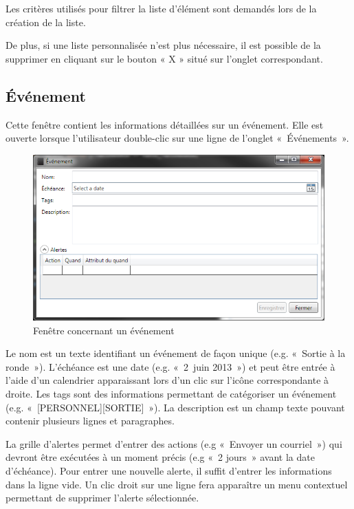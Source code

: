 \documentclass[letterpaper, oneside, 12pt, these, creativecommons]{thETS}
\begin{document}
Les critères utilisés pour filtrer la liste d'élément sont demandés lors de la création de la liste.

De plus, si une liste personnalisée n'est plus nécessaire, il est possible de la supprimer en cliquant sur le bouton « X » situé sur l'onglet correspondant.

\subsection{Événement}

Cette fenêtre contient les informations détaillées sur un événement. Elle est ouverte lorsque l'utilisateur double-clic sur une ligne de l'onglet « Événements ».

\begin{figure}
    \includegraphics[scale=0.7]{fenetre_evenement.png}
    \caption{Fenêtre concernant un événement}
\end{figure}

Le nom est un texte identifiant un événement de façon unique (e.g. « Sortie à la ronde »). L'échéance est une date (e.g. « 2 juin 2013 ») et peut être entrée à l'aide d'un calendrier apparaissant lors d'un clic sur l'icône correspondante à droite. Les tags sont des informations permettant de catégoriser un événement (e.g. « [PERSONNEL][SORTIE] »). La description est un champ texte pouvant contenir plusieurs lignes et paragraphes.

La grille d'alertes permet d'entrer des actions (e.g « Envoyer un courriel ») qui devront être exécutées à un moment précis (e.g « 2 jours » avant la date d'échéance). Pour entrer une nouvelle alerte, il suffit d'entrer les informations dans la ligne vide. Un clic droit sur une ligne fera apparaître un menu contextuel permettant de supprimer l'alerte sélectionnée.
\end{document}
